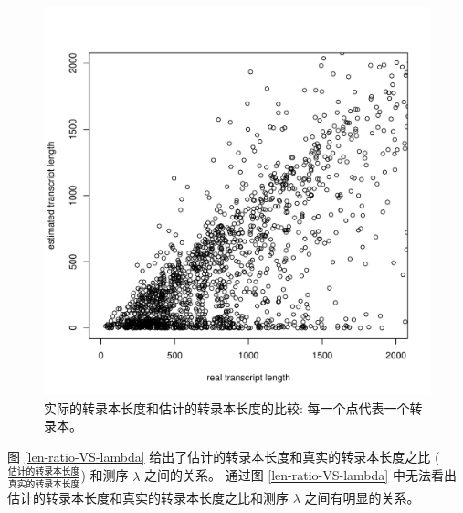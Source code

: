 \begin{figure}[!t]
\centering
\includegraphics[width=\textwidth]{figures/lenest/real-len-VS-est-len.pdf}
\caption[实际的转录本长度和估计的转录本长度的比较]
{实际的转录本长度和估计的转录本长度的比较: 每一个点代表一个转录本。}
\label{real-len-VS-est-len}
\end{figure}

图 \ref{len-ratio-VS-lambda} 给出了估计的转录本长度和真实的转录本长度之比 
($\frac{\text{估计的转录本长度}}{\text{真实的转录本长度}}$) 
和测序 $\lambda$ 
之间的关系。
通过图 \ref{len-ratio-VS-lambda} 中无法看出估计的转录本长度和真实的转录本长度之比和测序 
$\lambda$ 之间有明显的关系。

